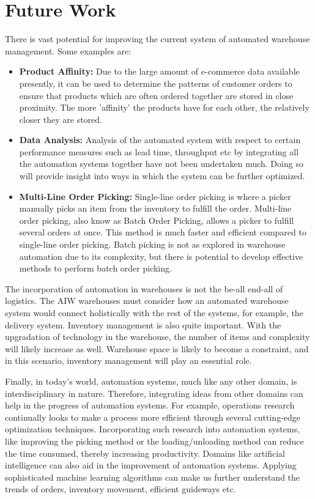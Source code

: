 \documentclass{report}
\begin{document}
\section{Future Work}

There is vast potential for improving the current system of automated warehouse management. Some examples are:

\begin{itemize}
    \item {\bfseries Product Affinity:}
    Due to the large amount of e-commerce data available presently, it can be used to determine the patterns of customer orders to ensure that products which are often ordered together are stored in close proximity. The more 'affinity' the products have for each other, the relatively closer they are stored.
    
    \item {\bfseries Data Analysis:}
    Analysis of the automated system with respect to certain performance measures such as lead time, throughput etc by integrating all the automation systems together have not been undertaken much. Doing so will provide insight into ways in which the system can be further optimized. 
    
    \item {\bfseries Multi-Line Order Picking:}
    Single-line order picking is where a picker manually picks an item from the inventory to fulfill the order. Multi-line order picking, also know as Batch Order Picking, allows a picker to fulfill several orders at once. This method is much faster and efficient compared to single-line order picking. Batch picking is not as explored in warehouse automation due to its complexity, but there is potential to develop effective methods to perform batch order picking.
    
\end{itemize}

The incorporation of automation in warehouses is not the be-all end-all of logistics. The AIW warehouses must consider how an automated warehouse system would connect holistically with the rest of the systems, for example, the delivery system. Inventory management is also quite important. With the upgradation of technology in the warehouse, the number of items and complexity will likely increase as well. Warehouse space is likely to become a constraint, and in this scenario, inventory management will play an essential role.

Finally, in today's world, automation systems, much like any other domain, is interdisciplinary in nature. Therefore, integrating ideas from other domains can help in the progress of automation systems. For example, operations research continually looks to make a process more efficient through several cutting-edge optimization techniques. Incorporating such research into automation systems, like improving the picking method or the loading/unloading method can reduce the time consumed, thereby increasing productivity. Domains like artificial intelligence can also aid in the improvement of automation systems. Applying sophisticated machine learning algorithms can make us further understand the trends of orders, inventory movement, efficient guideways etc.
\end{document}
